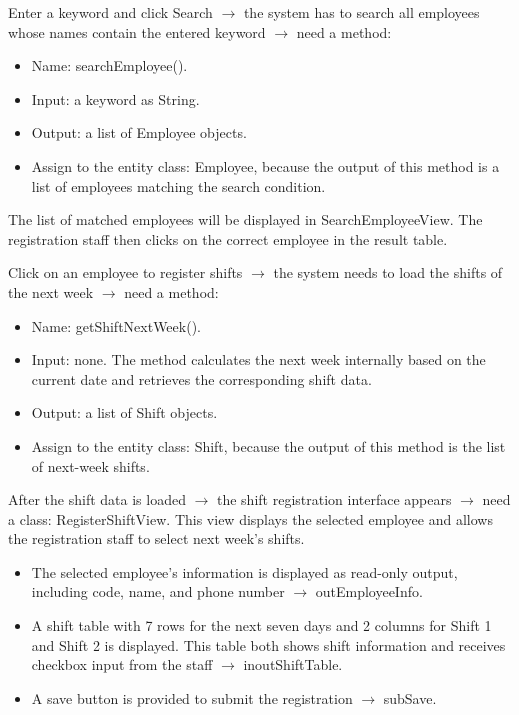 Enter a keyword and click Search $\rightarrow$ the system has to search all employees whose names contain the entered keyword $\rightarrow$ need a method:

\begin{itemize}
    \item Name: searchEmployee().
    \item Input: a keyword as String.
    \item Output: a list of Employee objects.
    \item Assign to the entity class: Employee, because the output of this method is a list of employees matching the search condition.
\end{itemize}

The list of matched employees will be displayed in SearchEmployeeView. The registration staff then clicks on the correct employee in the result table.

Click on an employee to register shifts $\rightarrow$ the system needs to load the shifts of the next week $\rightarrow$ need a method:

\begin{itemize}
    \item Name: getShiftNextWeek().
    \item Input: none. The method calculates the next week internally based on the current date and retrieves the corresponding shift data.
    \item Output: a list of Shift objects.
    \item Assign to the entity class: Shift, because the output of this method is the list of next-week shifts.
\end{itemize}

After the shift data is loaded $\rightarrow$ the shift registration interface appears $\rightarrow$ need a class: RegisterShiftView. This view displays the selected employee and allows the registration staff to select next week's shifts.

\begin{itemize}
    \item The selected employee's information is displayed as read-only output, including code, name, and phone number $\rightarrow$ outEmployeeInfo.
    \item A shift table with 7 rows for the next seven days and 2 columns for Shift 1 and Shift 2 is displayed. This table both shows shift information and receives checkbox input from the staff $\rightarrow$ inoutShiftTable.
    \item A save button is provided to submit the registration $\rightarrow$ subSave.
\end{itemize}

